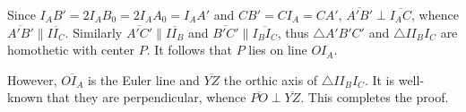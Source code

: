 Since $I_AB'=2I_AB_0=2I_AA_0=I_AA'$ and $CB'=CI_A=CA'$, $\overline{A'B'}\perp\overline{I_AC}$, whence $\overline{A'B'}\parallel\overline{II_C}$. Similarly $\overline{A'C'}\parallel\overline{II_B}$ and $\overline{B'C'}\parallel\overline{I_BI_C}$, thus $\triangle A'B'C'$ and $\triangle II_BI_C$ are homothetic with center $P$. It follows that $P$ lies on line $OI_A$.

However, $\overline{OI_A}$ is the Euler line and $\overline{YZ}$ the orthic axis of $\triangle II_BI_C$. It is well-known that they are perpendicular, whence $\overline{PO}\perp\overline{YZ}$. This completes the proof. 

